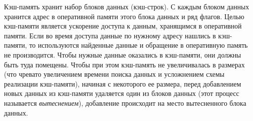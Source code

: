
Кэш-память хранит набор блоков данных (кэш-строк). С каждым блоком данных хранится адрес в оперативной памяти этого блока данных и ряд флагов. Целью кэш-памяти является ускорение доступа к данным, хранящимся в оперативной памяти. Если во время доступа данные по нужному адресу нашлись в кэш-памяти, то используются найденные данные и обращение в оперативную память не производится. Чтобы нужные данные оказались в кэш-памяти, они должны быть туда помещены. Чтобы при этом кэш-память не увеличивалась в размерах (что чревато увеличением времени поиска данных и усложнением схемы реализации кэш-памяти), начиная с некоторого ее размера, перед добавлением новых данных из кэш-памяти удаляется один из блоков данных (этот процесс называется \emph{вытеснением}), добавление происходит на место вытесненного блока данных.

